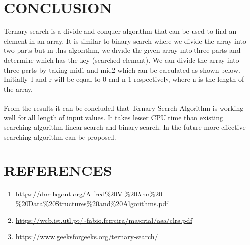 \documentclass[conference]{IEEEtran}
\begin{document}
\section{CONCLUSION}
Ternary search is a divide and conquer algorithm that can be used to find an element in an array. It is similar to binary search where we divide the array into two parts but in this algorithm, we divide the given array into three parts and determine which has the key (searched element). We can divide the array into three parts by taking mid1 and mid2 which can be calculated as shown below. Initially, l and r will be equal to 0 and n-1 respectively, where n is the length of the array. \\
\\
From the results it can be concluded that Ternary Search Algorithm is working well for all length of input values. It takes lesser CPU time than existing searching algorithm linear search and binary search. In the future more effective searching algorithm can be proposed.

\section{REFERENCES}
\begin{enumerate}
    \item \url{  https://doc.lagout.org/Alfred%20V.%20Aho%20-%20Data%20Structures%20and%20Algorithms.pdf }
    \item \url{ https://web.ist.utl.pt/~fabio.ferreira/material/asa/clrs.pdf }
    \item \url{ https://www.geeksforgeeks.org/ternary-search/}
\end{enumerate}
\end{document}
